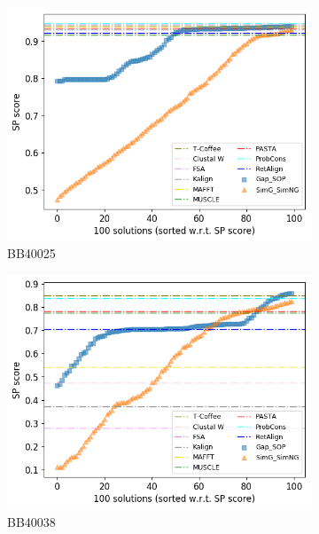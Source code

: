 \begin{figure}[!htbp]
\begin{adjustwidth}{-1cm}{-1cm}
		\begin{subfigure}{0.22\textwidth}
			\includegraphics[width=\columnwidth]{Figure/summary/precomputedInit/Balibase/BB40025_pairs_density_single_run_2}
			\caption{BB40025}
		\end{subfigure}
		\begin{subfigure}{0.22\textwidth}
			\includegraphics[width=\columnwidth]{Figure/summary/precomputedInit/Balibase/BB40038_pairs_density_single_run_2}
			\caption{BB40038}
		\end{subfigure}
		\begin{subfigure}{0.22\textwidth}

\end{subfigure}
\end{adjustwidth}
\end{figure}
